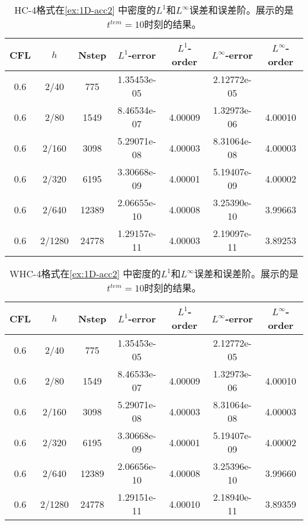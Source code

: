 \def\titleintable{CFL&$h$&Nstep&$L^1$-error&$L^1$-order&$L^\infty$-error&$L^\infty$-order\\}
\begin{table}[htbp]
  \caption{HC-4格式在\cref{ex:1D-acc2} 中密度的$L^1$和$L^\infty$误差和误差阶。展示的是$t^{tem} = 10$时刻的结果。}
  \label{ta:1D-ex2-HC4}
  \centering
  \begin{tabular}{ccccccc}
    \toprule
    \titleintable
    \midrule
    0.6 & 2/40   & 775   & 1.35453e-05 &         & 2.12772e-05 &         \\
    0.6 & 2/80   & 1549  & 8.46534e-07 & 4.00009 & 1.32973e-06 & 4.00010 \\
    0.6 & 2/160  & 3098  & 5.29071e-08 & 4.00003 & 8.31064e-08 & 4.00003 \\
    0.6 & 2/320  & 6195  & 3.30668e-09 & 4.00001 & 5.19407e-09 & 4.00002 \\
    0.6 & 2/640  & 12389 & 2.06655e-10 & 4.00008 & 3.25390e-10 & 3.99663 \\
    0.6 & 2/1280 & 24778 & 1.29157e-11 & 4.00003 & 2.19097e-11 & 3.89253 \\
    \bottomrule
  \end{tabular}
\end{table}

\begin{table}[htbp]
  \caption{WHC-4格式在\cref{ex:1D-acc2} 中密度的$L^1$和$L^\infty$误差和误差阶。展示的是$t^{tem} = 10$时刻的结果。}
  \label{ta:1D-ex2-WHC4}
  \centering
  \begin{tabular}{ccccccc}
    \toprule
    \titleintable
    \midrule
    0.6 & 2/40   & 775   & 1.35453e-05 &         & 2.12772e-05 &         \\
    0.6 & 2/80   & 1549  & 8.46533e-07 & 4.00009 & 1.32973e-06 & 4.00010 \\
    0.6 & 2/160  & 3098  & 5.29071e-08 & 4.00003 & 8.31064e-08 & 4.00003 \\
    0.6 & 2/320  & 6195  & 3.30668e-09 & 4.00001 & 5.19407e-09 & 4.00002 \\
    0.6 & 2/640  & 12389 & 2.06656e-10 & 4.00008 & 3.25396e-10 & 3.99660 \\
    0.6 & 2/1280 & 24778 & 1.29151e-11 & 4.00010 & 2.18940e-11 & 3.89359 \\
    \bottomrule
  \end{tabular}
\end{table}


